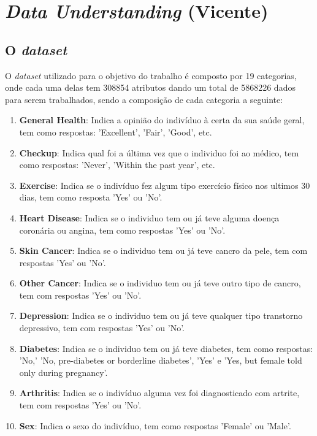 \chapter{\textit{Data Understanding} (Vicente)}
\label{chap2:data_und}

\section{O \textit{dataset}}
\label{chap2:dataset}

O \textit{dataset} utilizado para o objetivo do trabalho é composto por 19 categorias, onde cada uma delas tem 308854 atributos dando um total de 5868226 dados para serem trabalhados, sendo a composição de cada categoria a seguinte:

\begin{enumerate}
  \item \textbf{General Health}: Indica a opinião do indivíduo à certa da sua saúde geral, tem como respostas: 'Excellent', 'Fair', 'Good', etc.
  \item \textbf{Checkup}: Indica qual foi a última vez que o individuo foi ao médico, tem como respostas: 'Never', 'Within the past year', etc.
  \item \textbf{Exercise}: Indica se o indivíduo fez algum tipo exercício físico nos ultimos 30 dias, tem como resposta 'Yes' ou 'No'.
  \item \textbf{Heart Disease}: Indica se o individuo tem ou já teve alguma doença coronária ou angina, tem como respostas 'Yes' ou 'No'.
  \item \textbf{Skin Cancer}: Indica se o individuo tem ou já teve cancro da pele, tem com respostas 'Yes' ou 'No'.
  \item \textbf{Other Cancer}: Indica se o individuo tem ou já teve outro tipo de cancro, tem com respostas 'Yes' ou 'No'.
  \item \textbf{Depression}: Indica se o individuo tem ou já teve qualquer tipo transtorno depressivo, tem com respostas 'Yes' ou 'No'.
  \item \textbf{Diabetes}: Indica se o individuo tem ou já teve diabetes, tem como respostas: 'No,' 'No, pre-diabetes or borderline diabetes', 'Yes' e
 'Yes, but female told only during pregnancy'.
  \item \textbf{Arthritis}: Indica se o indivíduo alguma vez foi diagnosticado com artrite, tem com respostas 'Yes' ou 'No'.
  \item \textbf{Sex}: Indica o sexo do indivíduo, tem como respostas 'Female' ou 'Male'.

\end{enumerate}
